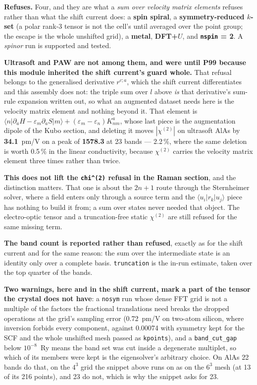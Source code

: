 \documentclass[11pt,a4paper]{article}
\newcommand{\code}[1]{\texttt{\small #1}}
\begin{document}
\begin{refuses}
\textbf{Refuses.} Four, and they are what a \emph{sum over velocity matrix
elements} refuses rather than what the shift current does: a \textbf{spin
spiral}, a \textbf{symmetry-reduced $k$-set} (a polar rank-3 tensor is not the
cell's until averaged over the point group; the escape is the whole unshifted
grid), a \textbf{metal}, \textbf{DFT+$U$}, and \textbf{\code{nspin} = 2}. A
\emph{spinor} run is supported and tested.

\textbf{Ultrasoft and PAW are not among them, and were until P99 because this
module inherited the shift current's guard whole.} That refusal belongs to the
generalised derivative $r^{c;a}$, which the shift current differentiates and
this assembly does not: the triple sum over $l$ above \emph{is} that
derivative's sum-rule expansion written out, so what an augmented dataset needs
here is the velocity matrix element and nothing beyond it. That element is
$\langle n|\partial_a H - \varepsilon_m\partial_a S|m\rangle + (\varepsilon_m -
\varepsilon_n)K^a_{nm}$, whose last piece is the augmentation dipole of the
Kubo section, and deleting it moves $|\chi^{(2)}|$ on ultrasoft AlAs by \textbf{34.1}~pm/V on a
peak of \textbf{1578.3} at 23 bands --- 2.2\,\%, where the same deletion is worth 0.5\,\% in
the linear conductivity, because $\chi^{(2)}$ carries the velocity matrix
element three times rather than twice.

\textbf{This does not lift the \code{chi\^{}(2)} refusal in the Raman section},
and the distinction matters. That one is about the $2n+1$ route through the
Sternheimer solver, where a field enters only through a source term and the
$\langle u_i|r_k|u_j\rangle$ piece has nothing to build it from; a sum over
states never needed that object. The electro-optic tensor and a truncation-free
static $\chi^{(2)}$ are still refused for the same missing term.

\textbf{The band count is reported rather than refused}, exactly as for the shift
current and for the same reason: the sum over the intermediate state is an
identity only over a complete basis. \code{truncation} is the in-run estimate,
taken over the top quarter of the bands.

\textbf{Two warnings, here and in the shift current, mark a part of the tensor
the crystal does not have}: a \code{nosym} run whose dense FFT grid is not a
multiple of the factors the fractional translations need breaks the dropped
operations at the grid's sampling error (0.72~pm/V on two-atom silicon, where
inversion forbids every component, against 0.00074 with symmetry kept for the
SCF and the whole unshifted mesh passed as \code{kpoints}), and a
\code{band\_cut\_gap} below $10^{-8}$~Ry means the band set was cut inside a
degenerate multiplet, so which of its members were kept is the eigensolver's
arbitrary choice. On AlAs 22 bands do that, on the $4^3$ grid the snippet
above runs on as on the $6^3$ mesh (at 13 of its 216 points), and 23 do not,
which is why the snippet asks for 23.
\end{refuses}
\end{document}
